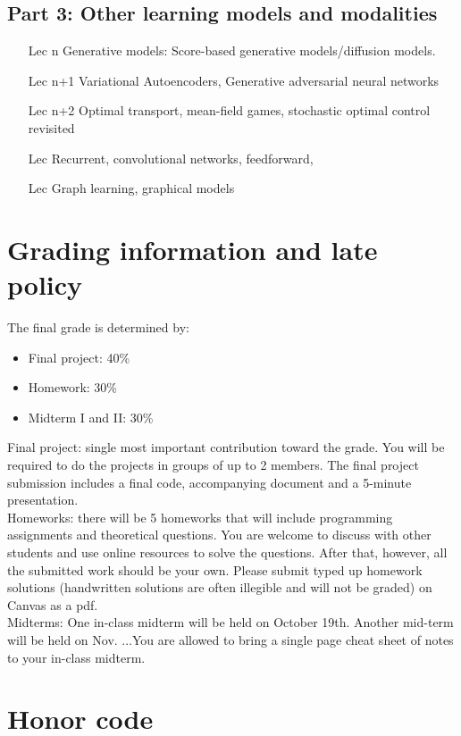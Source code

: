 \documentclass[12pt]{article}
\begin{document}
\subsection*{Part 3: Other learning models and modalities}
\begin{itemize}
	\item[Lec n] Generative models: Score-based generative models/diffusion models.
	\item[Lec n+1] Variational Autoencoders, Generative adversarial neural networks
	\item[Lec n+2] Optimal transport, mean-field games, stochastic optimal control revisited
	\item[Lec ] Recurrent, convolutional networks, feedforward, 
	\item[Lec ] Graph learning, graphical models
\end{itemize}

\section{Grading information and late policy}

The final grade is determined by:
\begin{itemize}
	\item Final project: 40\%
	\item Homework: 30\%
	\item Midterm I and II: 30\%
\end{itemize}
Final project: single most important contribution toward the grade. You will be required to do the projects in groups of up to 2 members. The final project submission includes a final code, accompanying document and a 5-minute presentation.\\

Homeworks: there will be 5 homeworks that will include programming assignments and theoretical questions. You are welcome to discuss with other students and use online resources to solve the questions. After that, however, all the submitted work should be your own. Please submit typed up homework solutions (handwritten solutions are often illegible and will not be graded) on Canvas as a pdf. \\

Midterms: One in-class midterm will be held on October 19th.
Another mid-term will be held on Nov. ...You are allowed to bring a single page cheat sheet of notes to your in-class midterm.

\section{Honor code}
\end{document}
